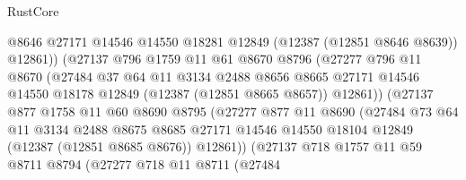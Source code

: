 \begin{lexlean}{RustCore}
\begin{coremodule}
                            @8646
                            @27171
                            @14546
                            @14550
                            @18281
                            @12849
                            (@12387 (@12851 @8646 @8639))
                            @12861))
                        (@27137
                          @796
                          @1759
                          @11
                          @61
                          @8670
                          @8796
                          (@27277
                            @796
                            @11
                            @8670
                            (@27484
                              @37
                              @64
                              @11
                              @3134
                              @2488
                              @8656
                              @8665
                              @27171
                              @14546
                              @14550
                              @18178
                              @12849
                              (@12387 (@12851 @8665 @8657))
                              @12861))
                          (@27137
                            @877
                            @1758
                            @11
                            @60
                            @8690
                            @8795
                            (@27277
                              @877
                              @11
                              @8690
                              (@27484
                                @73
                                @64
                                @11
                                @3134
                                @2488
                                @8675
                                @8685
                                @27171
                                @14546
                                @14550
                                @18104
                                @12849
                                (@12387 (@12851 @8685 @8676))
                                @12861))
                            (@27137
                              @718
                              @1757
                              @11
                              @59
                              @8711
                              @8794
                              (@27277
                                @718
                                @11
                                @8711
                                (@27484

\end{coremodule}
\end{lexlean}
